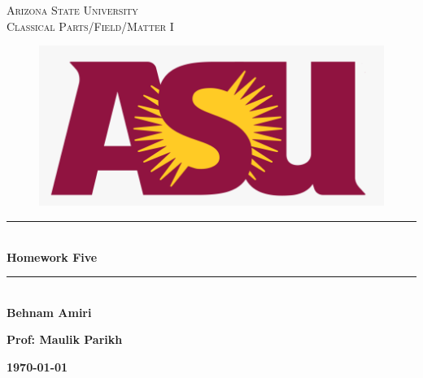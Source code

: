 \documentclass[fleqn]{article}
\begin{document}
  \begin{titlepage}

    \newcommand{\HRule}{\rule{\linewidth}{0.5mm}}

    \center


    \textsc{\LARGE Arizona State University}\\[1.5cm]

    \textsc{\LARGE Classical Parts/Field/Matter I}\\[1.5cm]


    \begin{figure}
      \includegraphics[width=\linewidth]{asu.png}
    \end{figure}


    \HRule \\[0.4cm]
    { \huge \bfseries Homework Five}\\[0.4cm] 
    \HRule \\[1.5cm]

    \textbf{Behnam Amiri}

    \bigbreak

    \textbf{Prof: Maulik Parikh}

    \bigbreak


    \textbf{{\large \today}\\[2cm]}

    \vfill

  \end{titlepage}
\end{document}
